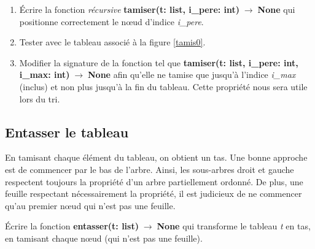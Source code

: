 \documentclass[a4paper,11pt]{article}
\begin{document}
\begin{Form}
\begin{center}
\label{tamis3}
\end{center}
\begin{activite}
\begin{enumerate}
\item Écrire la fonction \emph{récursive} \textbf{tamiser(t: list, i\_pere: int)$\;\rightarrow\;$None} qui positionne correctement le nœud d'indice \emph{i\_pere}.
\item Tester avec le tableau associé à la figure \ref{tamis0}.
\item Modifier la signature de la fonction tel que \textbf{tamiser(t: list, i\_pere: int, i\_max: int)$\;\rightarrow\;$None} afin qu'elle ne tamise que jusqu'à l'indice \emph{i\_max} (inclus) et non plus jusqu'à la fin du tableau. Cette propriété nous sera utile lors du tri.
\end{enumerate}
\end{activite}
\subsection{Entasser le tableau}
En tamisant chaque élément du tableau, on obtient un tas. Une bonne approche est de commencer par le bas de l'arbre. Ainsi, les sous-arbres droit et gauche respectent toujours la propriété d'un arbre partiellement ordonné. De plus, une feuille respectant nécessairement la propriété, il est judicieux de ne commencer qu'au premier nœud qui n'est pas une feuille.
\begin{activite}
Écrire la fonction \textbf{entasser(t: list)$\;\rightarrow\;$None} qui transforme le tableau \emph{t} en tas, en tamisant chaque nœud (qui n'est pas une feuille).
\end{activite} 

\end{Form}
\end{document}
